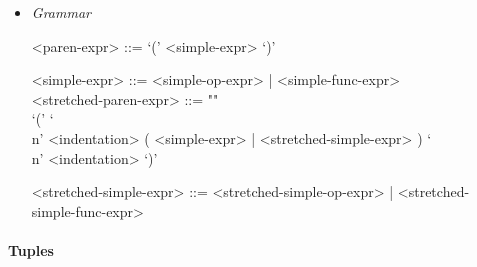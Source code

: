 \documentclass{article}
\begin{document}
\begin{itemize}
\item \textit{Grammar}
\begin{grammar}
<paren-expr> ::= `(' <simple-expr> `)' 

<simple-expr> ::= <simple-op-expr> | <simple-func-expr>\\

<stretched-paren-expr> ::= ""\\
`(' `\\n' <indentation> ( <simple-expr> | <stretched-simple-expr> )
`\\n' <indentation> `)'

<stretched-simple-expr> ::=
<stretched-simple-op-expr> | <stretched-simple-func-expr>
\end{grammar}

\end{itemize}

\paragraph{Tuples}
\end{document}
